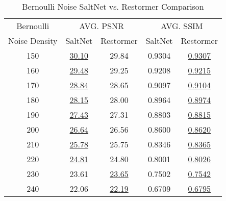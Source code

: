 \begin{table}[!hbt]
    \centering
    \begin{tabular}{ccccc}
        \hline
        Bernoulli & \multicolumn{2}{c}{AVG. PSNR} & \multicolumn{2}{c}{AVG. SSIM} \\
        Noise Density & SaltNet & Restormer & SaltNet & Restormer \\
        \hline
        150 & \underline{30.10} & 29.84 & 0.9304 & \underline{0.9307} \\
        160 & \underline{29.48} & 29.25 & 0.9208 & \underline{0.9215} \\
        170 & \underline{28.84} & 28.65 & 0.9097 & \underline{0.9104} \\
        180 & \underline{28.15} & 28.00 & 0.8964 & \underline{0.8974} \\
        190 & \underline{27.43} & 27.31 & 0.8803 & \underline{0.8815} \\
        200 & \underline{26.64} & 26.56 & 0.8600 & \underline{0.8620} \\
        210 & \underline{25.78} & 25.75 & 0.8346 & \underline{0.8365} \\
        220 & \underline{24.81} & 24.80 & 0.8001 & \underline{0.8026} \\
        230 & 23.61 & \underline{23.65} & 0.7502 & \underline{0.7542} \\
        240 & 22.06 & \underline{22.19} & 0.6709 & \underline{0.6795} \\
        \hline
    \end{tabular}
    \caption{Bernoulli Noise SaltNet vs. Restormer Comparison}
\end{table}
